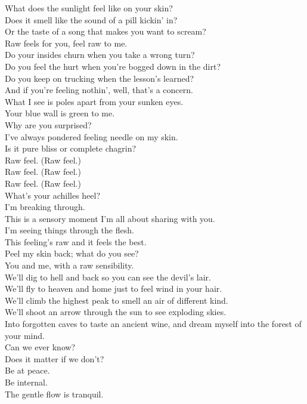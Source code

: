 What does the sunlight feel like on your skin? \\
Does it smell like the sound of a pill kickin' in? \\
Or the taste of a song that makes you want to scream? \\
Raw feels for you, feel raw to me. \\

Do your insides churn when you take a wrong turn? \\
Do you feel the hurt when you're bogged down in the dirt? \\
Do you keep on trucking when the lesson's learned? \\
And if you're feeling nothin', well, that's a concern. \\

What I see is poles apart from your sunken eyes. \\
Your blue wall is green to me. \\
Why are you surprised? \\
I've always pondered feeling needle on my skin. \\
Is it pure bliss or complete chagrin? \\

Raw feel. (Raw feel.) \\
Raw feel. (Raw feel.) \\
Raw feel. (Raw feel.) \\
What's your achilles heel? \\

I'm breaking through. \\
This is a sensory moment I'm all about sharing with you. \\
I'm seeing things through the flesh. \\
This feeling's raw and it feels the best. \\
Peel my skin back; what do you see? \\
You and me, with a raw sensibility. \\

We'll dig to hell and back so you can see the devil's lair. \\
We'll fly to heaven and home just to feel wind in your hair. \\
We'll climb the highest peak to smell an air of different kind. \\
We'll shoot an arrow through the sun to see exploding skies. \\
Into forgotten caves to taste an ancient wine, and dream myself into the forest of your mind. \\
Can we ever know? \\
Does it matter if we don't? \\
Be at peace. \\
Be internal. \\
The gentle flow is tranquil. \\


